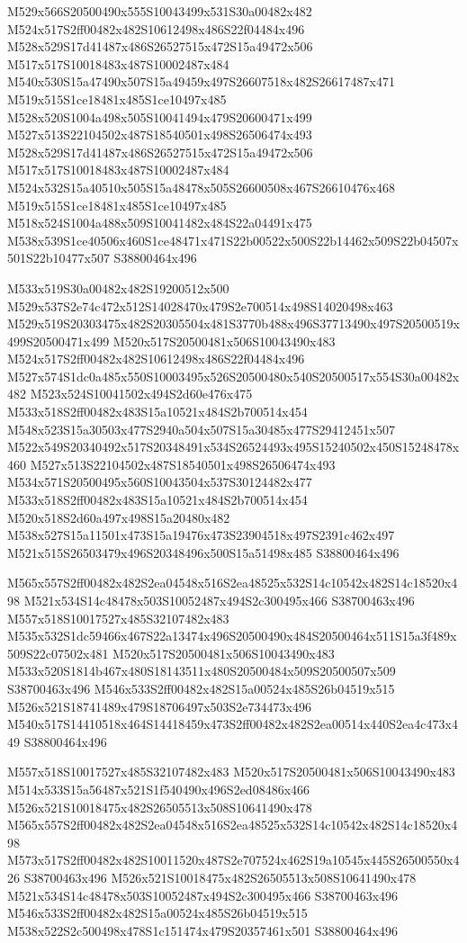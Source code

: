 \documentclass{article}
\begin{document}
\begin{multicols}{2}
M529x566S20500490x555S10043499x531S30a00482x482 M524x517S2ff00482x482S10612498x486S22f04484x496 M528x529S17d41487x486S26527515x472S15a49472x506 M517x517S10018483x487S10002487x484 M540x530S15a47490x507S15a49459x497S26607518x482S26617487x471 M519x515S1ce18481x485S1ce10497x485 M528x520S1004a498x505S10041494x479S20600471x499 M527x513S22104502x487S18540501x498S26506474x493 M528x529S17d41487x486S26527515x472S15a49472x506 M517x517S10018483x487S10002487x484 M524x532S15a40510x505S15a48478x505S26600508x467S26610476x468 M519x515S1ce18481x485S1ce10497x485 M518x524S1004a488x509S10041482x484S22a04491x475 M538x539S1ce40506x460S1ce48471x471S22b00522x500S22b14462x509S22b04507x501S22b10477x507 S38800464x496

M533x519S30a00482x482S19200512x500 M529x537S2e74c472x512S14028470x479S2e700514x498S14020498x463 M529x519S20303475x482S20305504x481S3770b488x496S37713490x497S20500519x499S20500471x499 M520x517S20500481x506S10043490x483 M524x517S2ff00482x482S10612498x486S22f04484x496 M527x574S1dc0a485x550S10003495x526S20500480x540S20500517x554S30a00482x482 M523x524S10041502x494S2d60e476x475 M533x518S2ff00482x483S15a10521x484S2b700514x454 M548x523S15a30503x477S2940a504x507S15a30485x477S29412451x507 M522x549S20340492x517S20348491x534S26524493x495S15240502x450S15248478x460 M527x513S22104502x487S18540501x498S26506474x493 M534x571S20500495x560S10043504x537S30124482x477 M533x518S2ff00482x483S15a10521x484S2b700514x454 M520x518S2d60a497x498S15a20480x482 M538x527S15a11501x473S15a19476x473S23904518x497S2391c462x497 M521x515S26503479x496S20348496x500S15a51498x485 S38800464x496

M565x557S2ff00482x482S2ea04548x516S2ea48525x532S14c10542x482S14c18520x498 M521x534S14c48478x503S10052487x494S2c300495x466 S38700463x496 M557x518S10017527x485S32107482x483 M535x532S1dc59466x467S22a13474x496S20500490x484S20500464x511S15a3f489x509S22c07502x481 M520x517S20500481x506S10043490x483 M533x520S1814b467x480S18143511x480S20500484x509S20500507x509 S38700463x496 M546x533S2ff00482x482S15a00524x485S26b04519x515 M526x521S18741489x479S18706497x503S2e734473x496 M540x517S14410518x464S14418459x473S2ff00482x482S2ea00514x440S2ea4c473x449 S38800464x496

M557x518S10017527x485S32107482x483 M520x517S20500481x506S10043490x483 M514x533S15a56487x521S1f540490x496S2ed08486x466 M526x521S10018475x482S26505513x508S10641490x478 M565x557S2ff00482x482S2ea04548x516S2ea48525x532S14c10542x482S14c18520x498 M573x517S2ff00482x482S10011520x487S2e707524x462S19a10545x445S26500550x426 S38700463x496 M526x521S10018475x482S26505513x508S10641490x478 M521x534S14c48478x503S10052487x494S2c300495x466 S38700463x496 M546x533S2ff00482x482S15a00524x485S26b04519x515 M538x522S2c500498x478S1c151474x479S20357461x501 S38800464x496


\end{multicols}
\end{document}
